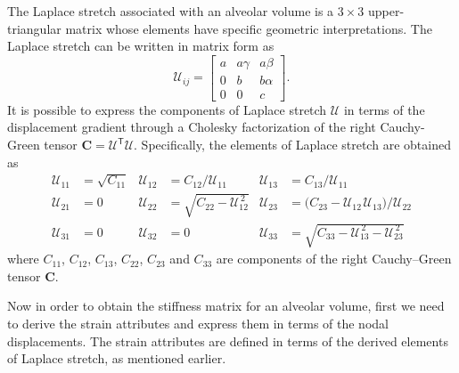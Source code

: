 The Laplace stretch associated with an alveolar volume is a $3\times3$ upper-triangular matrix whose elements have specific geometric interpretations. The Laplace stretch can be written in matrix form as \cite{FreedSrinivasa15}
\begin{equation}
    \label{LagrangianPhysicalStretch}
    \mathcal{U}_{ij} = \begin{bmatrix}
    a & a \gamma & a \beta \\
    0 & b & b \alpha \\
    0 & 0 & c \end{bmatrix} .
\end{equation}
It is possible to express the components of Laplace stretch $\boldsymbol{\mathcal{U}}$ in terms of the displacement gradient through a Cholesky factorization of the right Cauchy-Green tensor $\mathbf{C} = \boldsymbol{\mathcal{U}}^{\mathsf{T}} \boldsymbol{\mathcal{U}}$. Specifically, the elements of Laplace stretch are obtained as \cite{Srinivasa12}
\begin{equation}
\begin{aligned}
\mathcal{U}_{11} & = \sqrt{C_{11}} & 
\mathcal{U}_{12} & = C_{12} / \mathcal{U}_{11} &
\mathcal{U}_{13} & = C_{13} / \mathcal{U}_{11} \\
\mathcal{U}_{21} & = 0 &
\mathcal{U}_{22} & = \sqrt{C_{22} - \mathcal{U}_{12}^{\,2}} &
\mathcal{U}_{23} & = \bigl( C_{23} - \mathcal{U}_{12\,}\mathcal{U}_{13} \bigr) / \mathcal{U}_{22} \\
\mathcal{U}_{31} & = 0 &
\mathcal{U}_{32} & = 0 & 
\mathcal{U}_{33} & = \sqrt{C_{33} - \mathcal{U}_{13}^{\,2} - \mathcal{U}_{23}^{\,2}}
\end{aligned}
\label{LagrangianLaplaceStretch}
\end{equation}
where ${C_{11}}$, ${C_{12}}$, ${C_{13}}$, $C_{22}$, $C_{23}$ and ${C_{33}}$ are components of the right Cauchy--Green tensor $\mathbf{C}$.

Now in order to obtain the stiffness matrix for an alveolar volume, first we need to derive the strain attributes and express them in terms of the nodal displacements. The strain attributes are defined in terms of the derived elements of Laplace stretch, as mentioned earlier.

